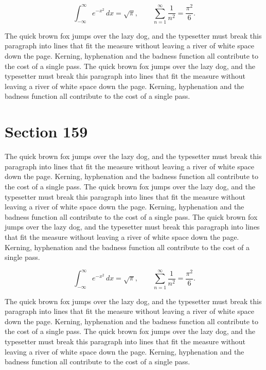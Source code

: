 \documentclass{article}
\begin{document}
\begin{equation}
\int_{-\infty}^{\infty} e^{-x^{2}}\,dx = \sqrt{\pi}, \qquad
\sum_{n=1}^{\infty} \frac{1}{n^{2}} = \frac{\pi^{2}}{6}.
\end{equation}

The quick brown fox jumps over the lazy dog, and the typesetter must break this paragraph into lines that fit the measure without leaving a river of white space down the page. Kerning, hyphenation and the badness function all contribute to the cost of a single pass. The quick brown fox jumps over the lazy dog, and the typesetter must break this paragraph into lines that fit the measure without leaving a river of white space down the page. Kerning, hyphenation and the badness function all contribute to the cost of a single pass. 
\section{Section 159}
The quick brown fox jumps over the lazy dog, and the typesetter must break this paragraph into lines that fit the measure without leaving a river of white space down the page. Kerning, hyphenation and the badness function all contribute to the cost of a single pass. The quick brown fox jumps over the lazy dog, and the typesetter must break this paragraph into lines that fit the measure without leaving a river of white space down the page. Kerning, hyphenation and the badness function all contribute to the cost of a single pass. The quick brown fox jumps over the lazy dog, and the typesetter must break this paragraph into lines that fit the measure without leaving a river of white space down the page. Kerning, hyphenation and the badness function all contribute to the cost of a single pass. 

\begin{equation}
\int_{-\infty}^{\infty} e^{-x^{2}}\,dx = \sqrt{\pi}, \qquad
\sum_{n=1}^{\infty} \frac{1}{n^{2}} = \frac{\pi^{2}}{6}.
\end{equation}

The quick brown fox jumps over the lazy dog, and the typesetter must break this paragraph into lines that fit the measure without leaving a river of white space down the page. Kerning, hyphenation and the badness function all contribute to the cost of a single pass. The quick brown fox jumps over the lazy dog, and the typesetter must break this paragraph into lines that fit the measure without leaving a river of white space down the page. Kerning, hyphenation and the badness function all contribute to the cost of a single pass. 
\end{document}
